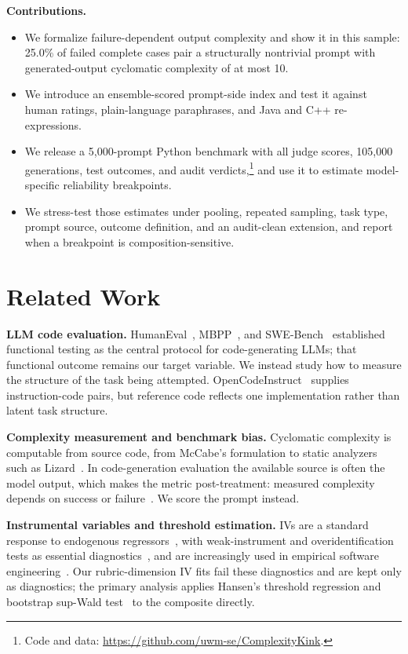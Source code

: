\documentclass{article}
\newcommand{\codeurl}{\url{https://github.com/uwm-se/ComplexityKink}}
\begin{document}
\vspace{2pt}
\noindent\textbf{Contributions.}
\begin{itemize}
\item We formalize failure-dependent output complexity and show it in this sample: 25.0\% of failed complete cases pair a structurally nontrivial prompt with generated-output cyclomatic complexity of at most 10.
\item We introduce an ensemble-scored prompt-side index and test it against human ratings, plain-language paraphrases, and Java and C++ re-expressions.
\item We release a 5{,}000-prompt Python benchmark with all judge scores, 105{,}000 generations, test outcomes, and audit verdicts,\footnote{Code and data: \codeurl{}.} and use it to estimate model-specific reliability breakpoints.
\item We stress-test those estimates under pooling, repeated sampling, task type, prompt source, outcome definition, and an audit-clean extension, and report when a breakpoint is composition-sensitive.
\end{itemize}

\section{Related Work}

\textbf{LLM code evaluation.} HumanEval~\cite{chen2021evaluating}, MBPP~\cite{austin2021program}, and SWE-Bench~\cite{jimenez2023swebench} established functional testing as the central protocol for code-generating LLMs; that functional outcome remains our target variable. We instead study how to measure the structure of the task being attempted. OpenCodeInstruct~\cite{opencodeinst} supplies instruction-code pairs, but reference code reflects one implementation rather than latent task structure.

\textbf{Complexity measurement and benchmark bias.} Cyclomatic complexity is computable from source code, from McCabe's formulation to static analyzers such as Lizard~\cite{mccabe1976complexity,lizard}. In code-generation evaluation the available source is often the model output, which makes the metric post-treatment: measured complexity depends on success or failure~\cite{montgomery2018posttreatment}. We score the prompt instead.

\textbf{Instrumental variables and threshold estimation.} IVs are a standard response to endogenous regressors~\cite{wooldridge2010econometric}, with weak-instrument and overidentification tests as essential diagnostics~\cite{stock2005testing,hansen1982large,bowsher2002reject}, and are increasingly used in empirical software engineering~\cite{grafvlachy2024cleaning,siebert2023applications}. Our rubric-dimension IV fits fail these diagnostics and are kept only as diagnostics; the primary analysis applies Hansen's threshold regression and bootstrap sup-Wald test~\cite{hansen2000sample} to the composite directly.
\end{document}
